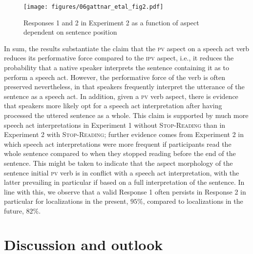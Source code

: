 \documentclass[output=paper,
colorlinks,
citecolor=brown,
newtxmath,
hidelinks
]{langscibook}
\begin{document}
\begin{figure}
\texttt{[image: figures/06gattnar\_etal\_fig2.pdf]}
\caption{Responses 1 and 2 in Experiment 2 as a function of aspect dependent on sentence position}
\label{fig:zwei}
\end{figure}

In sum, the results substantiate the claim that the \textsc{pv} aspect on a speech act verb reduces its performative force compared to the \textsc{ipv} aspect, i.e., it reduces the probability that a native speaker interprets the sentence containing it as to perform a speech act. However, the performative force of the verb is often preserved nevertheless, in that speakers frequently interpret the utterance of the sentence as a speech act. In addition, given a \textsc{pv} verb aspect, there is evidence that speakers more likely opt for a speech act interpretation after having processed the uttered sentence as a whole. This claim is supported by much more speech act interpretations in Experiment 1 without \textsc{Stop-Reading} than in Experiment 2 with \textsc{Stop-Reading}; further evidence comes from Experiment 2 in which speech act interpretations were more frequent if participants read the whole sentence compared to when they stopped reading before the end of the sentence. This might be taken to indicate that the aspect morphology of the sentence initial \textsc{pv} verb is in conflict with a speech act interpretation, with the latter prevailing in particular if based on a full interpretation of the sentence. In line with this, we observe that a valid Response 1 often persists in Response 2 in particular for localizations in the present, $95\%$, compared to localizations in the future, $82\%$.

\section{Discussion and outlook}\label{sct:drei}
\end{document}
